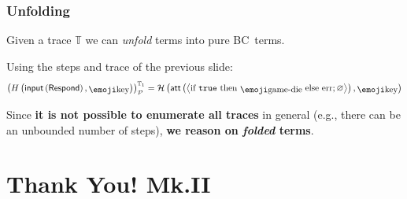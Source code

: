 \documentclass[aspectratio=169]{beamer}
\begin{document}
\begin{frame}
  \frametitle{Unfolding}

  Given a trace $\mathbb{T}$ we can \emph{unfold} terms into pure BC~terms.\pause

  \begin{Example}
    Using the steps and trace of the previous slide:\pause
    \[
      \mevalT[\mathbb{T}_1]{{H}\left( \mathsf{input}\left( \mathsf{Respond} \right), \mkey \right) } = \mathcal{H}\left( \matt\left(
        \left< \text{if }\btop\text{ then }\mdice
        \text{ else err}
        ; \varnothing \right> \right), \mkey  \right)
    \]
  \end{Example}\pause

  Since {\bfseries it is not possible to enumerate all traces} in general ({\RajdhaniRg e.g., there can be an unbounded number of steps}), {\bfseries we reason on \emph{folded} terms}.

\end{frame}

\section{Thank You! Mk.II}
\end{document}
